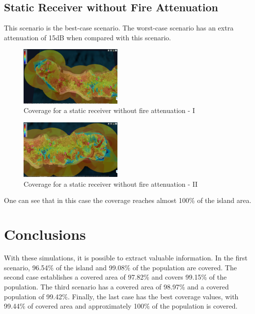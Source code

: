 \documentclass[letterpaper, 10 pt, conference]{ieeeconf}  %
\begin{document}
\subsection{Static Receiver without Fire Attenuation}
\noindent This scenario is the best-case scenario. The worst-case scenario has an extra attenuation of 15dB when compared with this scenario.
\begin{figure}[h!]
    \centering
    \includegraphics[width=0.45\textwidth]{RecetorEstaticoSemfogoI.JPG}
    \caption{Coverage for a static receiver without fire attenuation - I}
    \label{fig:estaticosemfogESTE}
\end{figure}
\begin{figure}[h!]
    \centering
    \includegraphics[width=0.45\textwidth]{RecetorEstaticoSemfogoII.JPG}
    \caption{Coverage for a static receiver without fire attenuation - II}
    \label{fig:estaticosemfogoOeste}
\end{figure} 
\FloatBarrier \noindent 
One can see that in this case the coverage reaches almost 100\% of the island area.

\section{Conclusions} \noindent
With these simulations, it is possible to extract valuable information.  In the first scenario, 96.54\% of the island and 99.08\% of the population are covered.  The second case establishes a covered area of 97.82\% and covers 99.15\% of the population.  The third scenario has a covered area of 98.97\% and a covered population of 99.42\%. Finally, the last case has the best coverage values, with 99.44\% of covered area and approximately 100\% of the population is covered. 
\addtolength{\textheight}{-12cm}   %
\end{document}
